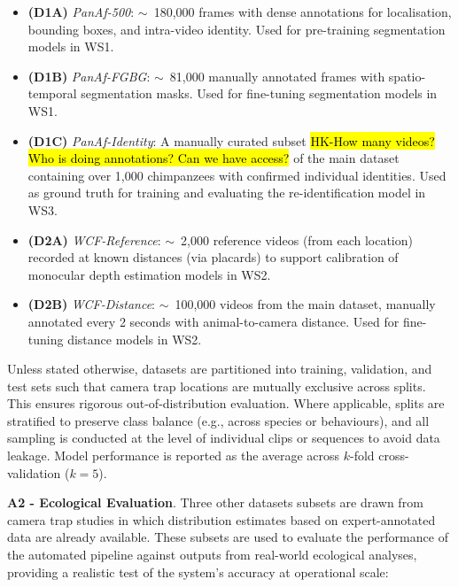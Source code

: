 \documentclass{article}
\begin{document}
\begin{itemize}
      \item \textbf{(D1A)} \textit{PanAf-500}: $\sim$~180,000 frames with dense annotations for localisation, bounding boxes, and intra-video identity. Used for pre-training segmentation models in WS1.

      \item \textbf{(D1B)} \textit{PanAf-FGBG}: $\sim$~81,000 manually annotated frames with spatio-temporal segmentation masks. Used for fine-tuning segmentation models in WS1.

      \item \textbf{(D1C)} \textit{PanAf-Identity}: A manually curated subset \hl{HK-How many videos? Who is doing annotations? Can we have access?} of the main dataset containing over 1,000 chimpanzees with confirmed individual identities. Used as ground truth for training and evaluating the re-identification model in WS3.

      \item \textbf{(D2A)} \textit{WCF-Reference}: $\sim$~2,000 reference videos (from each location) recorded at known distances (via placards) to support calibration of monocular depth estimation models in WS2.

      \item \textbf{(D2B)} \textit{WCF-Distance}: $\sim$~100,000 videos from the main dataset, manually annotated every 2 seconds with animal-to-camera distance. Used for fine-tuning distance models in WS2.
\end{itemize}

Unless stated otherwise, datasets are partitioned into training, validation, and test sets such that camera trap locations are mutually exclusive across splits. This ensures rigorous out-of-distribution evaluation. Where applicable, splits are stratified to preserve class balance (e.g., across species or behaviours), and all sampling is conducted at the level of individual clips or sequences to avoid data leakage. Model performance is reported as the average across $k$-fold cross-validation ($k=5$).



\textbf{A2 - Ecological Evaluation}. Three other datasets subsets are drawn from camera trap studies in which distribution estimates based on expert-annotated data are already available. These subsets are used to evaluate the performance of the automated pipeline against outputs from real-world ecological analyses, providing a realistic test of the system’s accuracy at operational scale:
\end{document}
